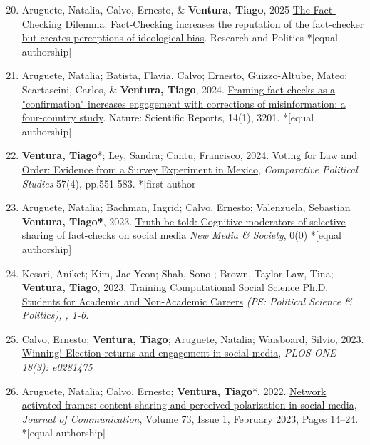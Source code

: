 \documentclass[letterpaper, 11pt]{article}
\newenvironment{benumerate}[1]{
    \let\oldItem\item
    \def\item{\addtocounter{enumi}{-2}\oldItem}
    \begin{enumerate}[leftmargin=2em]
    \setcounter{enumi}{#1}
    \addtocounter{enumi}{1}
}{
    \end{enumerate}
}
\begin{document}
\begin{benumerate}{19}
        \item Aruguete, Natalia, Calvo, Ernesto, \& \textbf{Ventura, Tiago}, 2025 \href{https://journals.sagepub.com/doi/10.1177/20531680251323120}{The Fact-Checking Dilemma: Fact-Checking increases the reputation of the fact-checker but creates perceptions of ideological bias}.  Research and Politics *[equal authorship]

       \item Aruguete, Natalia; Batista, Flavia, Calvo; Ernesto, Guizzo-Altube, Mateo; Scartascini, Carlos, \& \textbf{Ventura, Tiago}, 2024. \href{https://www.nature.com/articles/s41598-024-53337-0}{Framing fact-checks as a "confirmation" increases engagement with corrections of misinformation: a four-country study}. Nature: Scientific Reports, 14(1), 3201. *[equal authorship]

       \item \textbf{Ventura, Tiago}*; Ley, Sandra; Cantu, Francisco, 2024. \href{https://journals.sagepub.com/doi/10.1177/00104140231169035}{Voting for Law and Order: Evidence from a Survey Experiment in Mexico}, \textit{Comparative Political Studies} 57(4), pp.551-583. *[first-author]

        \item Aruguete, Natalia; Bachman, Ingrid; Calvo, Ernesto; Valenzuela, Sebastian \textbf{Ventura, Tiago*}, 2023. \href{https://journals.sagepub.com/doi/abs/10.1177/14614448231193709}{Truth be told: Cognitive moderators of selective sharing of fact-checks on social media} \textit{New Media \& Society}, 0(0)  *[equal authorship]


        \item Kesari, Aniket; Kim, Jae Yeon;  Shah, Sono ; Brown, Taylor Law, Tina; \textbf{Ventura, Tiago}, 2023. \href{https://www.cambridge.org/core/journals/ps-political-science-and-politics/article/training-computational-social-science-phd-students-for-academic-and-nonacademic-careers/1455690939833B9FFCAC664D4E412057}{Training Computational Social Science Ph.D. Students for Academic and Non-Academic Careers}  \textit{(PS: Political Science \& Politics), , 1-6.}

        \item Calvo, Ernesto; \textbf{Ventura, Tiago}; Aruguete, Natalia; Waisboard, Silvio, 2023. \href{https://journals.plos.org/plosone/article?id=10.1371/journal.pone.0281475}{Winning! Election returns and engagement in social media}, \textit{PLOS ONE 18(3): e0281475}

        \item Aruguete, Natalia; Calvo, Ernesto; \textbf{Ventura, Tiago}*, 2022. \href{https://academic.oup.com/joc/advance-article/doi/10.1093/joc/jqac035/6767335?searchresult=1}{Network activated frames: content sharing and perceived polarization in social media}, \textit{Journal of Communication}, Volume 73, Issue 1, February 2023, Pages 14–24.    *[equal authorship]


\end{benumerate}
\end{document}
